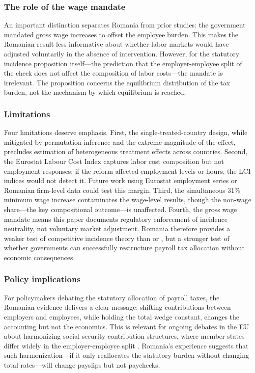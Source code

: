 \documentclass[12pt]{article}
\begin{document}
\subsubsection*{The role of the wage mandate} An important distinction separates Romania from prior studies: the government mandated gross wage increases to offset the employee burden. This makes the Romanian result less informative about whether labor markets would have adjusted voluntarily in the absence of intervention. However, for the statutory incidence proposition itself---the prediction that the employer-employee split of the check does not affect the composition of labor costs---the mandate is irrelevant. The proposition concerns the equilibrium distribution of the tax burden, not the mechanism by which equilibrium is reached.

\subsubsection*{Limitations} Four limitations deserve emphasis. First, the single-treated-country design, while mitigated by permutation inference and the extreme magnitude of the effect, precludes estimation of heterogeneous treatment effects across countries. Second, the Eurostat Labour Cost Index captures labor cost composition but not employment responses; if the reform affected employment levels or hours, the LCI indices would not detect it. Future work using Eurostat employment series or Romanian firm-level data could test this margin. Third, the simultaneous 31\% minimum wage increase contaminates the wage-level results, though the non-wage share---the key compositional outcome---is unaffected. Fourth, the gross wage mandate means this paper documents regulatory enforcement of incidence neutrality, not voluntary market adjustment. Romania therefore provides a weaker test of competitive incidence theory than \citet{gruber1997incidence} or \citet{saez2019payroll}, but a stronger test of whether governments can successfully restructure payroll tax allocation without economic consequences.

\subsubsection*{Policy implications} For policymakers debating the statutory allocation of payroll taxes, the Romanian evidence delivers a clear message: shifting contributions between employers and employees, while holding the total wedge constant, changes the accounting but not the economics. This is relevant for ongoing debates in the EU about harmonizing social security contribution structures, where member states differ widely in the employer-employee split \citep{eurostat2020labour}. Romania's experience suggests that such harmonization---if it only reallocates the statutory burden without changing total rates---will change payslips but not paychecks.
\end{document}
